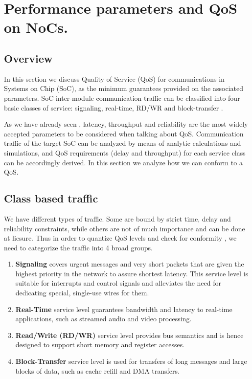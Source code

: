 
\lhead[\chaptername~\thechapter]{\rightmark}


\rhead[\leftmark]{}


\lfoot[\thepage]{}


\cfoot{}


\rfoot[]{\thepage}


\chapter{Performance parameters and QoS on NoCs.}


\section{Overview}

In this section we discuss Quality of Service (QoS) for communications
in Systems on Chip (SoC), as the minimum guarantees provided on the
associated parameters. SoC inter-module communication traffic can
be classified into four basic classes of service: signaling, real-time,
RD/WR and block-transfer .

As we have already seen , latency, throughput and reliability are
the most widely accepted parameters to be considered when talking
about QoS. Communication traffic of the target SoC can be analyzed
by means of analytic calculations and simulations, and QoS requirements
(delay and throughput) for each service class can be accordingly derived.
In this section we analyze how we can conform to a QoS.


\section{Class based traffic}

We have different types of traffic. Some are bound by strict time,
delay and reliability constraints, while others are not of much importance
and can be done at liesure. Thus in order to quantize QoS levels and
check for conformity , we need to categorize the traffic into 4 broad
groups.\cite{Bolotin:2004:QQA:985396.985400}
\begin{enumerate}
\item \textbf{Signaling} covers urgent messages and very short packets that
are given the highest priority in the network to assure shortest latency.
This service level is suitable for interrupts and control signals
and alleviates the need for dedicating special, single-use wires for
them. 
\item \textbf{Real-Time }service level guarantees bandwidth and latency
to real-time applications, such as streamed audio and video processing. 
\item \textbf{Read/Write (RD/WR)} service level provides bus semantics and
is hence designed to support short memory and register accesses. 
\item \textbf{Block-Transfer} service level is used for transfers of long
messages and large blocks of data, such as cache refill and DMA transfers. 
\end{enumerate}

